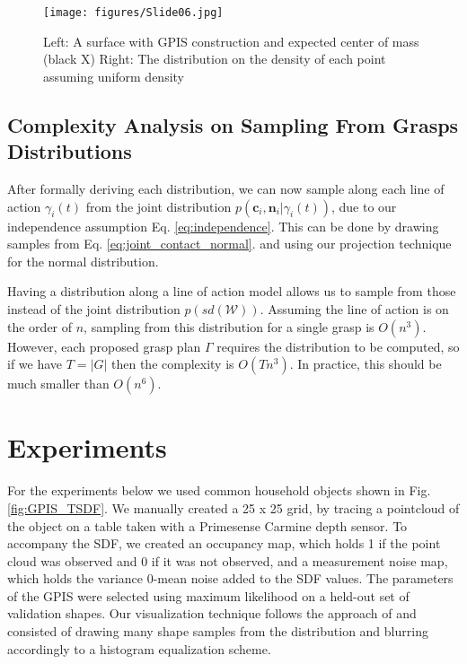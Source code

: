 \documentclass[letterpaper, 10 pt, conference]{ieeeconf}  %
\begin{document}
\begin{figure}[ht!]
\centering
\texttt{[image: figures/Slide06.jpg]}
\caption{ \footnotesize Left: A surface with GPIS construction and expected center of mass (black X)
Right: The distribution on the density of each point assuming uniform density}
\vspace*{-10pt}
\label{fig:GPIS_MASS}
\end{figure}

\subsection{Complexity Analysis on Sampling From Grasps Distributions}

After formally deriving each distribution,  we can now sample along each line of action $\gamma_i(t)$ from the joint distribution $p(\textbf{c}_i,\textbf{n}_i | \gamma_i(t))$, due to our independence assumption Eq. \ref{eq:independence}. This can be done by drawing samples from Eq. \ref{eq:joint_contact_normal}. and using our projection technique for the normal distribution. 

Having a distribution along a line of action model allows us to sample from those instead of the joint distribution $p(sd(\mathcal{W}))$. Assuming the line of action is on the order of $n$, sampling from this distribution for a single grasp is $O(n^3)$. However, each proposed grasp plan $\Gamma$ requires the distribution to be computed, so if we have $T=|G|$ then the complexity is $O(Tn^3)$. In practice, this should be much smaller than $O(n^6)$. 




\section{Experiments}
For the experiments below we used common household objects shown in Fig. \ref{fig:GPIS_TSDF}. We manually created a 25 x 25 grid, by tracing a pointcloud of the object on a table taken with a Primesense Carmine depth sensor. To accompany the SDF, we created an occupancy map, which holds 1 if the point cloud was observed and 0 if it was not observed, and a measurement noise map, which holds the variance 0-mean noise added to the SDF values. The parameters of the GPIS were selected using maximum likelihood on a held-out set of validation shapes. Our visualization technique follows the approach of \cite{jeffs} and consisted of drawing many shape samples from the distribution and blurring accordingly to a histogram equalization scheme. 
\end{document}
